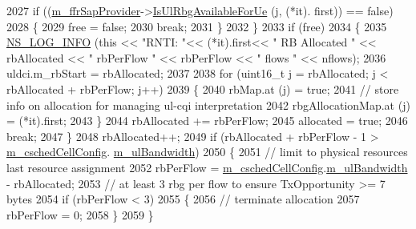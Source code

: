 \begin{DoxyCode}
2027               \textcolor{keywordflow}{if} ((\hyperlink{classns3_1_1PssFfMacScheduler_a8b7889293dd002f806e2d6afd9c50aed}{m\_ffrSapProvider}->\hyperlink{classns3_1_1LteFfrSapProvider_a3ef80840549b8ea3d50d2cef8a9866e2}{IsUlRbgAvailableForUe} (j, (*it).
      first)) == \textcolor{keyword}{false})
2028                 \{
2029                   free = \textcolor{keyword}{false};
2030                   \textcolor{keywordflow}{break};
2031                 \}
2032             \}
2033           \textcolor{keywordflow}{if} (free)
2034             \{
2035                   \hyperlink{group__logging_gafbd73ee2cf9f26b319f49086d8e860fb}{NS\_LOG\_INFO} (\textcolor{keyword}{this} << \textcolor{stringliteral}{"RNTI: "}<< (*it).first<< \textcolor{stringliteral}{" RB Allocated "} << rbAllocated 
      << \textcolor{stringliteral}{" rbPerFlow "} << rbPerFlow << \textcolor{stringliteral}{" flows "} << nflows);
2036               uldci.m\_rbStart = rbAllocated;
2037 
2038               \textcolor{keywordflow}{for} (uint16\_t j = rbAllocated; j < rbAllocated + rbPerFlow; j++)
2039                 \{
2040                   rbMap.at (j) = \textcolor{keyword}{true};
2041                   \textcolor{comment}{// store info on allocation for managing ul-cqi interpretation}
2042                   rbgAllocationMap.at (j) = (*it).first;
2043                 \}
2044               rbAllocated += rbPerFlow;
2045               allocated = \textcolor{keyword}{true};
2046               \textcolor{keywordflow}{break};
2047             \}
2048           rbAllocated++;
2049           \textcolor{keywordflow}{if} (rbAllocated + rbPerFlow - 1 > \hyperlink{classns3_1_1PssFfMacScheduler_a6808e2b2024ed0ced82f80bfe6f0801f}{m\_cschedCellConfig}.
      \hyperlink{structns3_1_1FfMacCschedSapProvider_1_1CschedCellConfigReqParameters_a5ab5b102878e6e7e7727a14af4a64d2f}{m\_ulBandwidth})
2050             \{
2051               \textcolor{comment}{// limit to physical resources last resource assignment}
2052               rbPerFlow = \hyperlink{classns3_1_1PssFfMacScheduler_a6808e2b2024ed0ced82f80bfe6f0801f}{m\_cschedCellConfig}.\hyperlink{structns3_1_1FfMacCschedSapProvider_1_1CschedCellConfigReqParameters_a5ab5b102878e6e7e7727a14af4a64d2f}{m\_ulBandwidth} - rbAllocated;
2053               \textcolor{comment}{// at least 3 rbg per flow to ensure TxOpportunity >= 7 bytes}
2054               \textcolor{keywordflow}{if} (rbPerFlow < 3)
2055                 \{
2056                   \textcolor{comment}{// terminate allocation}
2057                   rbPerFlow = 0;                 
2058                 \}
2059             \}

\end{DoxyCode}
